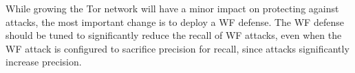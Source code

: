 While growing the Tor network will have a minor impact on protecting against
\name attacks, the most important change is to deploy a WF defense. The
WF defense should be tuned to significantly reduce the recall of WF attacks,
even when the WF attack is configured to sacrifice precision for recall, since
\name attacks significantly increase precision.
